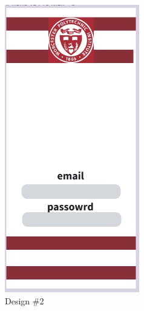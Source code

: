 \begin{figure}[H]
\begin{subfigure}{0.33\textwidth}
        \includegraphics[width=0.6\linewidth]{assets/img/login_2.jpg}
        \caption{Design \#2}
        \label{fig:login_screens_2}
    \end{subfigure}%
    \begin{subfigure}{0.33\textwidth}
        \centering

\end{subfigure}
\end{figure}
